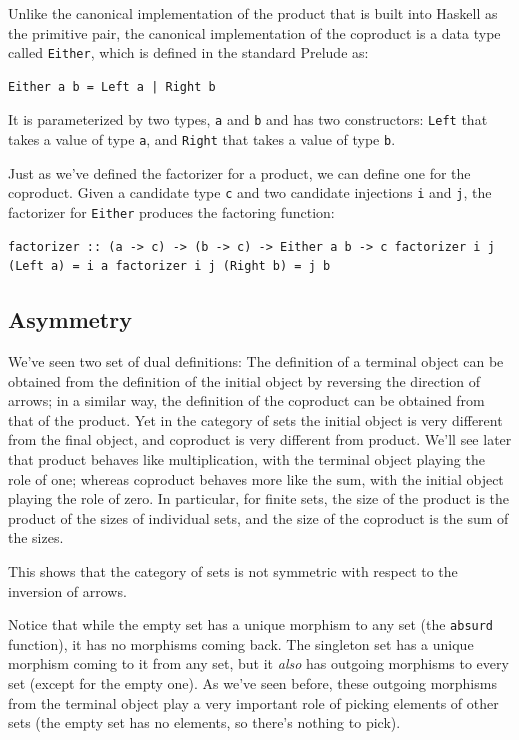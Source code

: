 Unlike the canonical implementation of the product that is built into
Haskell as the primitive pair, the canonical implementation of the
coproduct is a data type called \texttt{Either}, which is defined in the
standard Prelude as:

\begin{verbatim}
Either a b = Left a | Right b
\end{verbatim}

It is parameterized by two types, \texttt{a} and \texttt{b} and has two
constructors: \texttt{Left} that takes a value of type \texttt{a}, and
\texttt{Right} that takes a value of type \texttt{b}.

Just as we've defined the factorizer for a product, we can define one
for the coproduct. Given a candidate type \texttt{c} and two candidate
injections \texttt{i} and \texttt{j}, the factorizer for \texttt{Either}
produces the factoring function:

\begin{verbatim}
factorizer :: (a -> c) -> (b -> c) -> Either a b -> c factorizer i j (Left a) = i a factorizer i j (Right b) = j b
\end{verbatim}

\subsection{Asymmetry}\label{asymmetry}

We've seen two set of dual definitions: The definition of a terminal
object can be obtained from the definition of the initial object by
reversing the direction of arrows; in a similar way, the definition of
the coproduct can be obtained from that of the product. Yet in the
category of sets the initial object is very different from the final
object, and coproduct is very different from product. We'll see later
that product behaves like multiplication, with the terminal object
playing the role of one; whereas coproduct behaves more like the sum,
with the initial object playing the role of zero. In particular, for
finite sets, the size of the product is the product of the sizes of
individual sets, and the size of the coproduct is the sum of the sizes.

This shows that the category of sets is not symmetric with respect to
the inversion of arrows.

Notice that while the empty set has a unique morphism to any set (the
\texttt{absurd} function), it has no morphisms coming back. The
singleton set has a unique morphism coming to it from any set, but it
\emph{also} has outgoing morphisms to every set (except for the empty
one). As we've seen before, these outgoing morphisms from the terminal
object play a very important role of picking elements of other sets (the
empty set has no elements, so there's nothing to pick).

